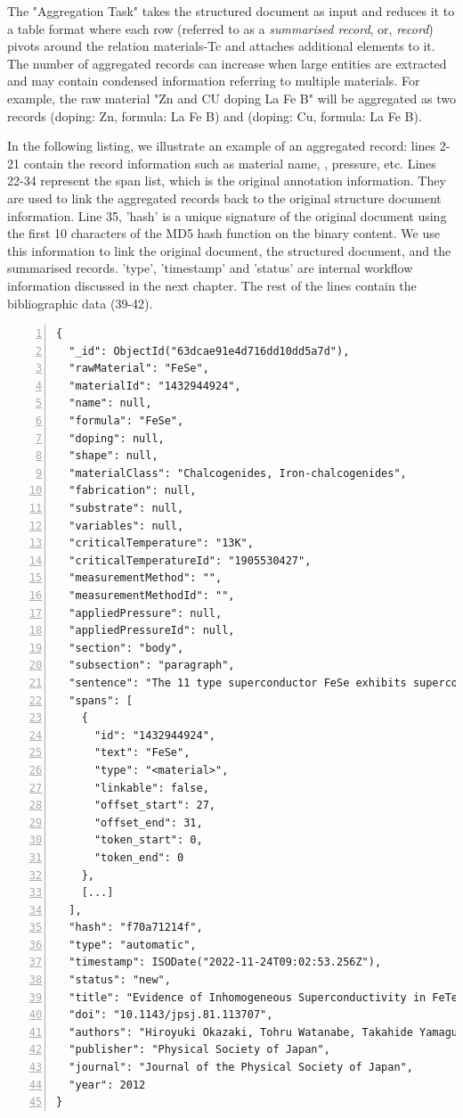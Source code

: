 The "Aggregation Task" takes the structured document as input and reduces it to a table format where each row (referred to as a \textit{summarised record}, or, \textit{record}) pivots around the relation materials-Tc and attaches additional elements to it. 
The number of aggregated records can increase when large entities are extracted and may contain condensed information referring to multiple materials. 
For example, the raw material "Zn and CU doping La Fe B" will be aggregated as two records (doping: Zn, formula: La Fe B) and (doping: Cu, formula: La Fe B). 

In the following listing, we illustrate an example of an aggregated record: lines 2-21 contain the record information such as material name, \tc, pressure, etc. Lines 22-34 represent the span list, which is the original annotation information. They are used to link the aggregated records back to the original structure document information. 
Line 35, 'hash' is a unique signature of the original document using the first 10 characters of the MD5 hash function on the binary content. We use this information to link the original document, the structured document, and the summarised records.
'type', 'timestamp' and 'status' are internal workflow information discussed in the next chapter. 
The rest of the lines contain the bibliographic data (39-42).

\begin{lstlisting}[numbers=left,numbersep=5pt,caption=Example of record related to the FeSe material after the aggregation.]
{
  "_id": ObjectId("63dcae91e4d716dd10dd5a7d"),
  "rawMaterial": "FeSe",
  "materialId": "1432944924",
  "name": null,
  "formula": "FeSe",
  "doping": null,
  "shape": null,
  "materialClass": "Chalcogenides, Iron-chalcogenides",
  "fabrication": null,
  "substrate": null,
  "variables": null,
  "criticalTemperature": "13K",
  "criticalTemperatureId": "1905530427",
  "measurementMethod": "",
  "measurementMethodId": "",
  "appliedPressure": null,
  "appliedPressureId": null,
  "section": "body",
  "subsection": "paragraph",
  "sentence": "The 11 type superconductor FeSe exhibits superconductivity with T c = 13K [2] and its T c reaches 37K under high pressure (4-6 GPa) [3,4].",
  "spans": [
    {
      "id": "1432944924",
      "text": "FeSe",
      "type": "<material>",
      "linkable": false,
      "offset_start": 27,
      "offset_end": 31,
      "token_start": 0,
      "token_end": 0
    },
    [...]
  ],
  "hash": "f70a71214f",
  "type": "automatic",
  "timestamp": ISODate("2022-11-24T09:02:53.256Z"),
  "status": "new",
  "title": "Evidence of Inhomogeneous Superconductivity in FeTe1-xSexby Scotch-Tape Method",
  "doi": "10.1143/jpsj.81.113707",
  "authors": "Hiroyuki Okazaki, Tohru Watanabe, Takahide Yamaguchi, Yasuna Kawasaki, Keita Deguchi, Satoshi Demura, Toshinori Ozaki, Saleem. J. Denholme, Yoshikazu Mizuguchi, Hiroyuki Takeya, Yoshihiko Takano",
  "publisher": "Physical Society of Japan",
  "journal": "Journal of the Physical Society of Japan",
  "year": 2012
}
\end{lstlisting}


